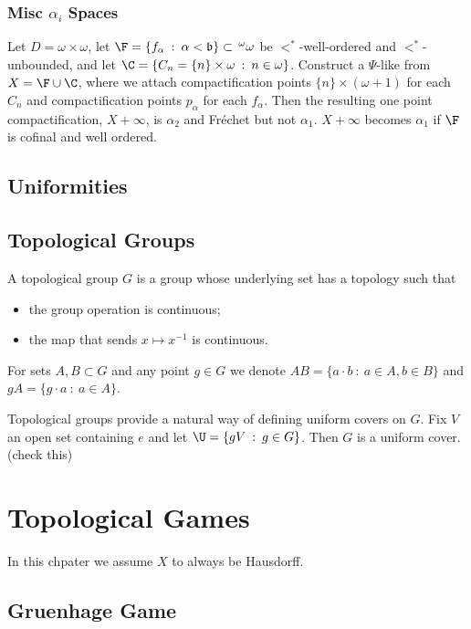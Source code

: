 \documentclass{article}
\begin{document}
\subsubsection{Misc \(\alpha_i\) Spaces}

\begin{exam}
     Let \(D = \omega\times\omega\), let \(\F = \{f_{\alpha} \: : \: \alpha < \mathfrak{b}\} \subset \, ^\omega\omega\) be \(<^{\ast}\)-well-ordered and \(<^{\ast}\)-unbounded, and let \(\C = \{C_n = \{n\} \times \omega \: : \: n \in \omega\}\). Construct a \(\Psi\)-like from \(X = \F \cup \C\), where we attach compactification points \(\{n\} \times (\omega+1)\) for each \(C_n\) and compactification points \(p_{\alpha}\) for each \(f_{\alpha}\). Then the resulting one point compactification, \(X + \infty\), is \(\alpha_2\) and Fréchet but not \(\alpha_1\). \(X + \infty\) becomes \(\alpha_1\) if \(\F\) is cofinal and well ordered. 
\end{exam}
\subsection{Uniformities}

\subsection{Topological Groups}
\begin{defn}
    A topological group \(G\) is a group whose underlying set has a topology such that 
    \begin{itemize}
        \item the group operation is continuous;
        \item the map that sends \(x \mapsto x^{-1}\) is continuous.
    \end{itemize}
    For sets \(A, B \subset G\) and any point \(g \in G\) we denote \(AB = \{a\cdot b \: : \: a \in A, b \in B\}\) and \(gA = \{g\cdot a \: : \: a \in A\}\).
\end{defn}
 
Topological groups provide a natural way of defining uniform covers on \(G\). Fix \(V\) an open set containing \(e\) and let \(\U = \{gV \: : \: g \in G\}\). Then \(G\) is a uniform cover. (check this)

\section{Topological Games}
In this chpater we assume \(X\) to always be Hausdorff.
\subsection{Gruenhage Game}
\end{document}
